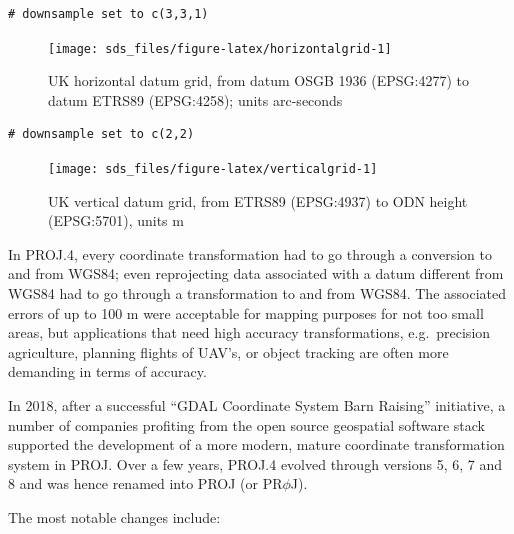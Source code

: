 \documentclass[]{book}
\begin{document}
\begin{verbatim}
# downsample set to c(3,3,1)
\end{verbatim}

\begin{figure}

{\centering \texttt{[image: sds\_files/figure-latex/horizontalgrid-1]} 

}

\caption{UK horizontal datum grid, from datum OSGB 1936 (EPSG:4277) to datum ETRS89 (EPSG:4258); units arc-seconds}\label{fig:horizontalgrid}
\end{figure}

\begin{verbatim}
# downsample set to c(2,2)
\end{verbatim}

\begin{figure}

{\centering \texttt{[image: sds\_files/figure-latex/verticalgrid-1]} 

}

\caption{UK vertical datum grid, from ETRS89 (EPSG:4937) to ODN height (EPSG:5701), units m}\label{fig:verticalgrid}
\end{figure}

In PROJ.4, every coordinate transformation had to go through a
conversion to and from WGS84; even reprojecting data associated with
a datum different from WGS84 had to go through a transformation to
and from WGS84. The associated errors of up to 100 m were acceptable
for mapping purposes for not too small areas, but applications that
need high accuracy transformations, e.g.~precision agriculture,
planning flights of UAV's, or object tracking are often more
demanding in terms of accuracy.

In 2018, after a successful ``GDAL Coordinate System Barn Raising''
initiative, a number of companies profiting from the open source
geospatial software stack supported the development of a more modern,
mature coordinate transformation system in PROJ. Over a few years,
PROJ.4 evolved through versions 5, 6, 7 and 8 and was hence renamed
into PROJ (or PR\(\phi\)J).

The most notable changes include:
\end{document}
